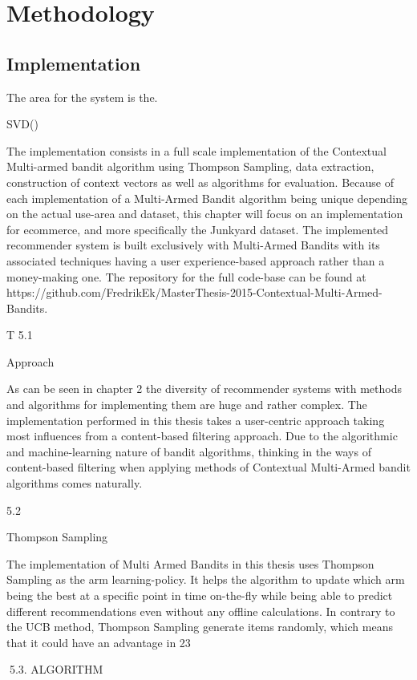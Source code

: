 \chapter{Methodology}


\section{Implementation}
The area for the system is the.

SVD()

The implementation consists in a full scale implementation of the Contextual
Multi-armed bandit algorithm using Thompson Sampling, data extraction,
construction of context vectors as well as algorithms for evaluation. Because of
each implementation of a Multi-Armed Bandit algorithm being unique depending on the actual use-area and dataset, this chapter will focus on an implementation for ecommerce, and more specifically the Junkyard dataset. The implemented recommender
system is built exclusively with Multi-Armed Bandits with its associated techniques
having a user experience-based approach rather than a money-making one. The repository for the full code-base can be found at https://github.com/FredrikEk/MasterThesis-2015-Contextual-Multi-Armed-Bandits.

T
5.1

Approach

As can be seen in chapter 2 the diversity of recommender systems with methods and
algorithms for implementing them are huge and rather complex. The implementation
performed in this thesis takes a user-centric approach taking most influences from a
content-based filtering approach. Due to the algorithmic and machine-learning nature
of bandit algorithms, thinking in the ways of content-based filtering when applying
methods of Contextual Multi-Armed bandit algorithms comes naturally.

5.2

Thompson Sampling

The implementation of Multi Armed Bandits in this thesis uses Thompson Sampling
as the arm learning-policy. It helps the algorithm to update which arm being the best
at a specific point in time on-the-fly while being able to predict different recommendations even without any offline calculations. In contrary to the UCB method, Thompson
Sampling generate items randomly, which means that it could have an advantage in
23

5.3. ALGORITHM



